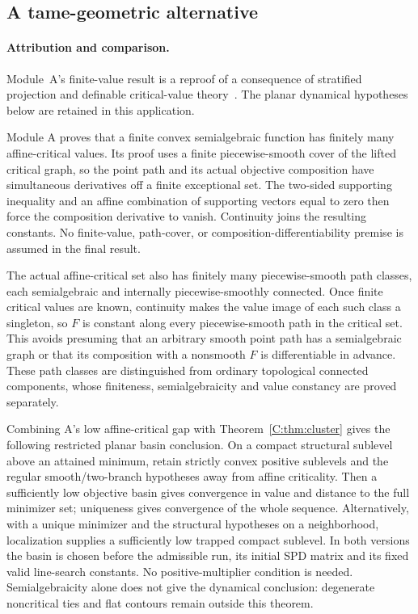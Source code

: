 \subsection{A tame-geometric alternative}
\paragraph{Attribution and comparison.}
Module~A's finite-value result is a reproof of a consequence of stratified projection and definable critical-value theory~\cite{BDLS}. The planar dynamical hypotheses below are retained in this application.

Module A proves that a finite convex semialgebraic function has finitely many affine-critical values. Its proof uses a finite piecewise-smooth cover of the lifted critical graph, so the point path and its actual objective composition have simultaneous derivatives off a finite exceptional set. The two-sided supporting inequality and an affine combination of supporting vectors equal to zero then force the composition derivative to vanish. Continuity joins the resulting constants. No finite-value, path-cover, or composition-differentiability premise is assumed in the final result.

The actual affine-critical set also has finitely many piecewise-smooth path classes, each semialgebraic and internally piecewise-smoothly connected. Once finite critical values are known, continuity makes the value image of each such class a singleton, so $F$ is constant along every piecewise-smooth path in the critical set. This avoids presuming that an arbitrary smooth point path has a semialgebraic graph or that its composition with a nonsmooth $F$ is differentiable in advance. These path classes are distinguished from ordinary topological connected components, whose finiteness, semialgebraicity and value constancy are proved separately.

Combining A's low affine-critical gap with Theorem~\ref{C:thm:cluster} gives the following restricted planar basin conclusion. On a compact structural sublevel above an attained minimum, retain strictly convex positive sublevels and the regular smooth/two-branch hypotheses away from affine criticality. Then a sufficiently low objective basin gives convergence in value and distance to the full minimizer set; uniqueness gives convergence of the whole sequence. Alternatively, with a unique minimizer and the structural hypotheses on a neighborhood, localization supplies a sufficiently low trapped compact sublevel. In both versions the basin is chosen before the admissible run, its initial SPD matrix and its fixed valid line-search constants. No positive-multiplier condition is needed. Semialgebraicity alone does not give the dynamical conclusion: degenerate noncritical ties and flat contours remain outside this theorem.


